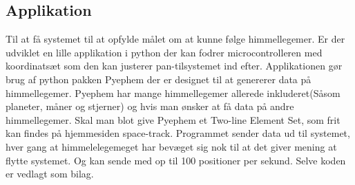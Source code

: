 \subsection{Applikation}
Til at få systemet til at opfylde målet om at kunne følge himmellegemer. Er der udviklet en lille applikation i python der kan fodrer microcontrolleren med koordinatsæt som den kan justerer pan-tilsystemet ind efter. Applikationen gør brug af python pakken Pyephem\cite{Pyephem} der er designet til at genererer data på himmellegemer. Pyephem har mange himmellegemer allerede inkluderet(Såsom planeter, måner og stjerner) og hvis man ønsker at få data på andre himmellegemer. Skal man blot give Pyephem et Two-line Element Set, som frit kan findes på hjemmesiden space-track\cite{https://www.space-track.org}. Programmet sender data ud til systemet, hver gang at himmelelegemeget har bevæget sig nok til at det giver mening at flytte systemet. Og kan sende med op til 100 positioner per sekund. Selve koden er vedlagt som bilag.